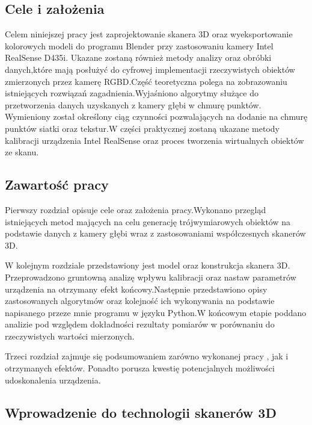 \documentclass[12pt]{article}
\begin{document}
\subsection{Cele i założenia}
Celem niniejszej pracy jest zaprojektowanie skanera 3D oraz wyeksportowanie kolorowych modeli do programu Blender przy zastosowaniu kamery Intel RealSense D435i.
Ukazane zostaną również metody analizy oraz obróbki danych,które mają posłużyć do cyfrowej implementacji rzeczywistych obiektów zmierzonych przez kamerę RGBD.Część teoretyczna polega na zobrazowaniu istniejących rozwiązań zagadnienia.Wyjaśniono algorytmy służące do przetworzenia danych uzyskanych z kamery głębi w chmurę punktów. Wymieniony został określony ciąg czynności pozwalających na dodanie na chmurę punktów siatki oraz tekstur.W części praktycznej zostaną ukazane metody kalibracji urządzenia Intel RealSense oraz proces tworzenia wirtualnych obiektów ze skanu.
\subsection{Zawartość pracy}
Pierwszy rozdział opisuje cele oraz założenia pracy.Wykonano przegląd istniejących metod mających na celu generację trójwymiarowych obiektów na podstawie danych z kamery głębi wraz z zastosowaniami współczesnych skanerów 3D.

W kolejnym rozdziale przedstawiony jest model oraz konstrukcja skanera 3D. Przeprowadzono gruntowną analizę wpływu kalibracji oraz nastaw parametrów urządzenia na otrzymany efekt końcowy.Następnie przedstawiono opisy zastosowanych algorytmów oraz kolejność ich wykonywania na podstawie napisanego przeze mnie programu w języku Python.W końcowym etapie poddano analizie pod względem dokładności rezultaty pomiarów w porównaniu do rzeczywistych wartości mierzonych.

Trzeci rozdział zajmuje się podsumowaniem zarówno wykonanej pracy , jak i otrzymanych efektów. Ponadto porusza kwestię potencjalnych możliwości udoskonalenia urządzenia.

\subsection{Wprowadzenie do technologii skanerów 3D}
\end{document}
